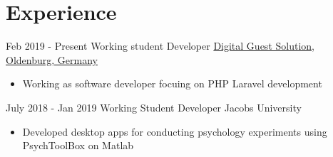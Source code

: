 \documentclass[letterpaper]{twentysecondcv} %
\begin{document}
\section{Experience}

\begin{twenty} %

      \twentyitem
        {Feb 2019 -}
        {Present}
        {Working student Developer}
        {\href{https://guest-solutions.com}{Digital Guest Solution, Oldenburg, Germany}}
        {}
        {
        {\begin{itemize}
        \item Working as software developer focuing on PHP Laravel development\\
    \end{itemize}}
        }
    \twentyitem
        {July 2018 -}
        {Jan 2019}
        {Working Student Developer}
        {Jacobs University}
        {}
        {\begin{itemize}
        \item Developed  desktop apps for conducting psychology experiments using PsychToolBox on Matlab \\
        \end{itemize}} 
    \begin{comment}    
    \twentyitem
        {Feb 2019 -}
        {Present}
        {Working student Developer}
        {\href{https://guest-solutions.com}{Digital Guest Solution, Oldenburg, Germany}}
        {}
        {
        {\begin{itemize}
        \item Working on full stack web development and learning\\
    \end{itemize}}
        }
    
        
        \twentyitem
        {Jul 2016 -}
        {Aug 2017}
        {Co-founder, Trainer}
        {\href{https://techgenxblog.wordpress.com}{TechGenX Robotics, Kathmandu, Nepal}}
        
        {
        {\begin{itemize}
        \item Tutored children about Robotics and Computer Programming, organized Robotics workshops, Science Exhibitions and built robotic and electronic prototype projects 
        \end{itemize}}}
        \end{comment}
        

\end{twenty}
\end{document}
